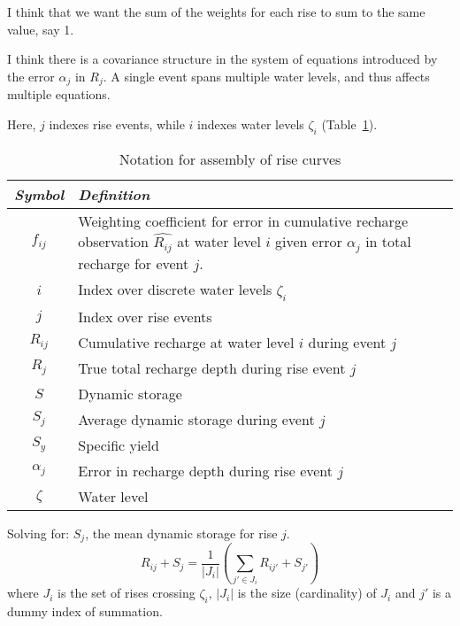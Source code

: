 \documentclass[11pt,a4paper]{article}
\begin{document}
I think that we want the sum of the weights for each rise to sum to
the same value, say 1.

I think there is a covariance structure in the system of equations
introduced by the error $\alpha_j$ in $R_j$.  A single event spans
multiple water levels, and thus affects multiple equations.

Here, $j$ indexes rise events, while $i$ indexes water levels
$\zeta_i$ (Table~\ref{tab:rise_notation}).

\begin{table}[b!]
  \centering
  \begin{tabular}{cp{10.8cm}}
    \emph{Symbol} & \emph{Definition} \\
    \hline
    $f_{ij}$ & Weighting coefficient for error in cumulative recharge
               observation $\widehat{R_{ij}}$ at water level $i$ given
               error $\alpha_j$ in total recharge for event $j$.\\
    $i$ & Index over discrete water levels $\zeta_i$\\
    $j$ & Index over rise events\\
    $R_{ij}$ & Cumulative recharge at water level $i$ during event $j$ \\
    $R_j$ & True total recharge depth during rise event $j$ \\
    $S$ & Dynamic storage \\
    $S_j$ & Average dynamic storage during event $j$ \\
    $S_y$ & Specific yield \\
    $\alpha_j$ & Error in recharge depth during rise event $j$ \\
    $\zeta$ & Water level \\
  \end{tabular}
  \caption{Notation for assembly of rise curves}
  \label{tab:rise_notation}
\end{table}

Solving for: $S_j$, the mean dynamic storage for rise $j$.
\begin{equation}
  R_{ij} + S_j = \frac{1}{|J_i|}\left(\sum_{j'\in J_i} R_{ij'} + S_{j'}\right)
\end{equation}
where $J_i$ is the set of rises crossing $\zeta_i$, $|J_i|$ is the
size (cardinality) of $J_i$ and $j'$ is a dummy index of summation.
\end{document}
